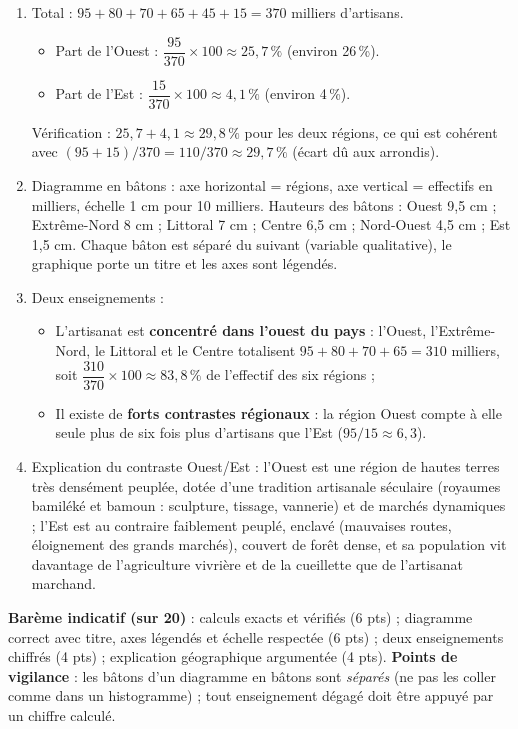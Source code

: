 \documentclass[11pt]{article}
\begin{document}
\begin{corrige}
\begin{enumerate}
\item Total : $95 + 80 + 70 + 65 + 45 + 15 = 370$ milliers d'artisans.
\begin{itemize}
\item Part de l'Ouest : $\dfrac{95}{370} \times 100 \approx 25{,}7\,\%$ (environ 26\,\%).
\item Part de l'Est : $\dfrac{15}{370} \times 100 \approx 4{,}1\,\%$ (environ 4\,\%).
\end{itemize}
Vérification : $25{,}7 + 4{,}1 \approx 29{,}8\,\%$ pour les deux régions, ce qui est cohérent avec $(95+15)/370 = 110/370 \approx 29{,}7\,\%$ (écart dû aux arrondis).
\item Diagramme en bâtons : axe horizontal = régions, axe vertical = effectifs en milliers, échelle 1 cm pour 10 milliers. Hauteurs des bâtons : Ouest 9,5 cm ; Extrême-Nord 8 cm ; Littoral 7 cm ; Centre 6,5 cm ; Nord-Ouest 4,5 cm ; Est 1,5 cm. Chaque bâton est séparé du suivant (variable qualitative), le graphique porte un titre et les axes sont légendés.
\item Deux enseignements :
\begin{itemize}
\item L'artisanat est \textbf{concentré dans l'ouest du pays} : l'Ouest, l'Extrême-Nord, le Littoral et le Centre totalisent $95+80+70+65 = 310$ milliers, soit $\dfrac{310}{370} \times 100 \approx 83{,}8\,\%$ de l'effectif des six régions ;
\item Il existe de \textbf{forts contrastes régionaux} : la région Ouest compte à elle seule plus de six fois plus d'artisans que l'Est ($95/15 \approx 6{,}3$).
\end{itemize}
\item Explication du contraste Ouest/Est : l'Ouest est une région de hautes terres très densément peuplée, dotée d'une tradition artisanale séculaire (royaumes bamiléké et bamoun : sculpture, tissage, vannerie) et de marchés dynamiques ; l'Est est au contraire faiblement peuplé, enclavé (mauvaises routes, éloignement des grands marchés), couvert de forêt dense, et sa population vit davantage de l'agriculture vivrière et de la cueillette que de l'artisanat marchand.
\end{enumerate}
\textbf{Barème indicatif (sur 20)} : calculs exacts et vérifiés (6 pts) ; diagramme correct avec titre, axes légendés et échelle respectée (6 pts) ; deux enseignements chiffrés (4 pts) ; explication géographique argumentée (4 pts).
\textbf{Points de vigilance} : les bâtons d'un diagramme en bâtons sont \emph{séparés} (ne pas les coller comme dans un histogramme) ; tout enseignement dégagé doit être appuyé par un chiffre calculé.
\end{corrige}
\end{document}
